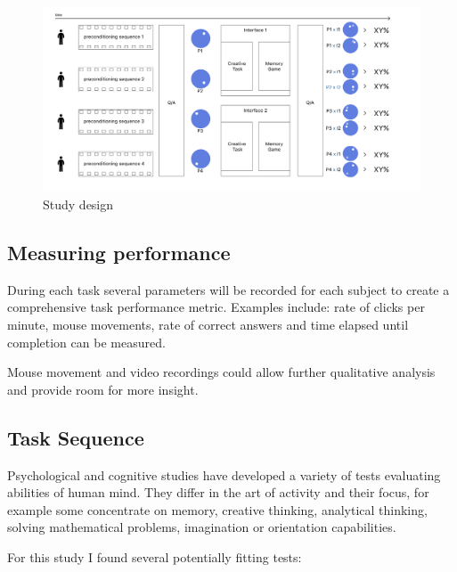 \begin{figure}
	\begin{center}
		\includegraphics[width=1\textwidth]{images/study_design2.png}
		\caption{Study design\label{fig:scaled_diss}}
	\end{center}
\end{figure}

\subsection{Measuring performance} \label{measuring}

During each task several parameters will be recorded for each subject to create a comprehensive task performance metric. 
Examples include: rate of clicks per minute, mouse movements, rate of correct answers and time elapsed until completion can be measured. 

Mouse movement and video recordings could allow further qualitative analysis and provide room for more insight.

\subsection{Task Sequence} \label{task_sequence}

Psychological and cognitive studies have developed a variety of tests evaluating abilities of human mind. 
They differ in the art of activity and their focus, for example some concentrate on memory, creative thinking, analytical thinking, solving mathematical problems, imagination or orientation capabilities.

For this study I found several potentially fitting tests:


